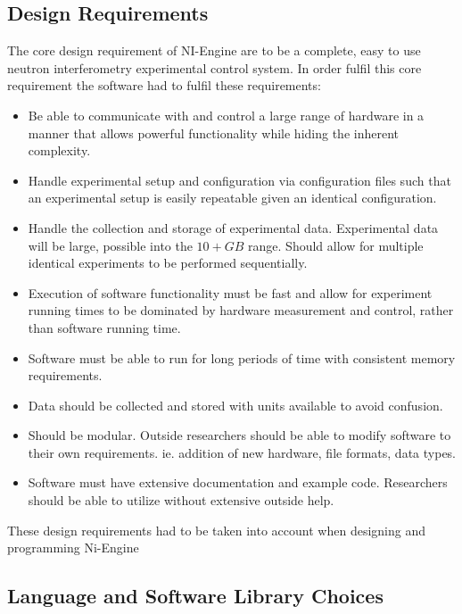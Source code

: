\subsection{Design Requirements}
\label{sec:requirements}
The core design requirement of NI-Engine are to be a complete, easy to use neutron interferometry experimental control system. In order fulfil this core requirement the software had to fulfil these requirements: 
\begin{itemize}
  \item Be able to communicate with and control a large range of hardware in a manner that allows powerful functionality while hiding the inherent complexity. 
  \item Handle experimental setup and configuration via configuration files such that an experimental setup is easily repeatable given an identical configuration. 
  \item Handle the collection and storage of experimental data. Experimental data will be large, possible into the $10+GB$ range. Should allow for multiple identical experiments to be performed sequentially.
  \item Execution of software functionality must be fast and allow for experiment running times to be dominated by hardware measurement and control, rather than software running time. 
  \item Software must be able to run for long periods of time with consistent memory requirements.
  \item Data should be collected and stored with units available to avoid confusion.  
  \item Should be modular. Outside researchers should be able to modify software to their own requirements. ie. addition of new hardware, file formats, data types. 
  \item Software must have extensive documentation and example code. Researchers should be able to utilize without extensive outside help.  
\end{itemize}
These design requirements had to be taken into account when designing and programming Ni-Engine
\subsection{Language and Software Library Choices}
